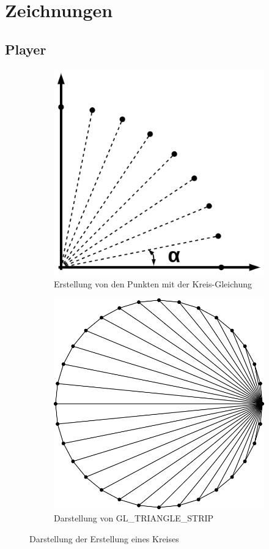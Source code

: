 \documentclass[doktyp=studarbeit]{TUBAFarbeiten}
\begin{document}
\section{Zeichnungen}

\subsection{Player}

\begin{figure}[!h]
    \centering
    \begin{subfigure}[b]{0.4\textwidth}
        \centering
        \includegraphics[width=0.8\linewidth]{kreis-1.png}
        \caption{Erstellung von den Punkten mit der Kreis-Gleichung}
    \end{subfigure}
    \begin{subfigure}[b]{0.4\textwidth}
        \centering
        \includegraphics[width=0.8\linewidth]{kreis-2.png}
        \caption{Darstellung von GL\_TRIANGLE\_STRIP}
    \end{subfigure}
    \caption{Darstellung der Erstellung eines Kreises}
    \label{fig:player}
\end{figure}
\end{document}
